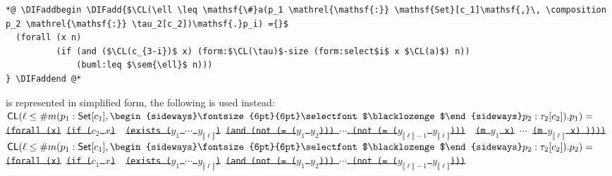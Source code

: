 \documentclass[10pt,fleqn,final]{scrreprt}
\newcommand*{\CL}{\ensuremath{\mathsf{CL}}\xspace}
\newenvironment{definitions}[0]{\medskip }{}
\newcommand{\composition}{\raisebox{0.2pt}{\begin{sideways}\fontsize{6pt}{6pt}\selectfont$\blacklozenge$\end{sideways}}}
\newcommand{\sem}[1]{\mathopen\llbracket#1\mathclose\rrbracket}
\newcommand{\white}[1]{{\color{white}{#1}}}
\newcommand{\qqquad}{\white{x}\qquad}
\providecommand{\DIFadd}[1]{{\protect\color{blue}\uwave{#1}}} %
\providecommand{\DIFdel}[1]{{\protect\color{red}\sout{#1}}}                      %
\providecommand{\DIFaddbegin}{} %
\providecommand{\DIFaddend}{} %
\providecommand{\DIFdelbegin}{} %
\begin{document}
\begin{definitions}
\begin{lstlisting}[language=clif, mathescape]
*@ \DIFaddbegin \DIFadd{$\CL(\ell \leq \mathsf{\#}a(p_1 \mathrel{\mathsf{:}} \mathsf{Set}[c_1]\mathsf{,}\, \composition p_2 \mathrel{\mathsf{:}} \tau_2[c_2])\mathsf{.}p_i) ={}$
  (forall (x n)
          (if (and ($\CL(c_{3-i})$ x) (form:$\CL(\tau)$-size (form:select$i$ x $\CL(a)$) n))
              (buml:leq $\sem{\ell}$ n)))
} \DIFaddend @*
\end{lstlisting}

\noindent \DIFaddbegin \DIFadd{If $a$
}\DIFaddend is represented in simplified form, the following is used instead:
\DIFdelbegin %
\DIFdel{$\CL(\ell \leq \mathsf{\#}m(p_1 \mathrel{\mathsf{:}} \mathsf{Set}[c_1]\mathsf{,}\, \composition p_2 \mathrel{\mathsf{:}} \tau_2[c_2])\mathsf{.}p_1)=$}%
\texttt{\DIFdel{(forall (x)}%
\DIFdel{(if ($c_2$ $x$) }%
\DIFdel{(exists ($y_1$ $\cdots$ $y_{\sem{\ell}}$)}%
\DIFdel{(and (not (= ($y_1$ $y_2$))) $\cdots$  (not (= ($y_{\sem{\ell}-1}$ $y_{\sem{\ell}}$))) }%
\DIFdel{(m $y_1$ x)}%
\DIFdel{$\cdots$}%
\DIFdel{(m $y_{\sem{\ell}}$ x) ))))}}%
\DIFdel{$\CL(\ell \leq \mathsf{\#}m(p_1 \mathrel{\mathsf{:}} \mathsf{Set}[c_1]\mathsf{,}\, \composition p_2 \mathrel{\mathsf{:}} \tau_2[c_2])\mathsf{.}p_2)=$}%
\texttt{\DIFdel{(forall (x)}%
\DIFdel{(if ($c_1$ $x$) }%
\DIFdel{(exists ($y_1$ $\cdots$ $y_{\sem{\ell}}$)}%
\DIFdel{(and (not (= ($y_1$ $y_2$))) $\cdots$  (not (= ($y_{\sem{\ell}-1}$ $y_{\sem{\ell}}$))) }%
}
\end{definitions}
\end{document}
